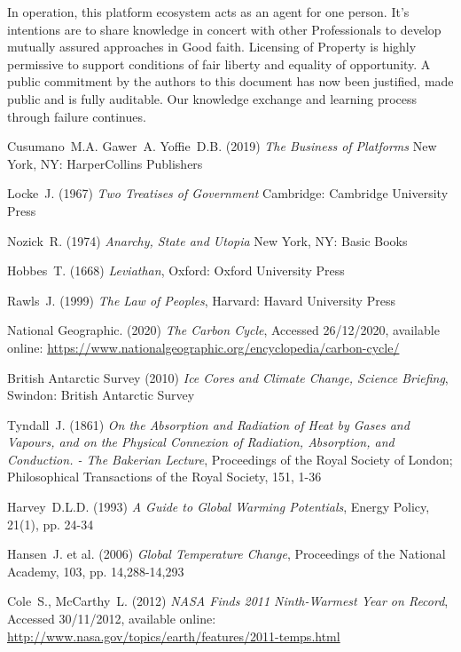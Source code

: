 \documentclass[11pt, oneside]{article}   	%
\begin{document}
In operation, this platform ecosystem acts as an agent for one person.
It's intentions are to share knowledge in concert with other Professionals to develop mutually assured approaches in Good faith.
Licensing of Property is highly permissive to support conditions of fair liberty and equality of opportunity.
A public commitment by the authors to this document has now been justified, made public and is fully auditable.
Our knowledge exchange and learning process through failure continues.\

\pagebreak

\begin{thebibliography}{99}

 Cusumano~M.A. Gawer~A. Yoffie~D.B. (2019)
\emph{The Business of Platforms}
New York, NY: HarperCollins Publishers

 Locke~J. (1967)
\emph{Two Treatises of Government}
Cambridge: Cambridge University Press

 Nozick~R. (1974)
\emph{Anarchy, State and Utopia}
New York, NY: Basic Books

 Hobbes~T. (1668)
\emph{Leviathan},
Oxford: Oxford University Press

 Rawls~J. (1999)
\emph{The Law of Peoples},
Harvard: Havard University Press

 National Geographic. (2020)
\emph{The Carbon Cycle},
Accessed 26/12/2020, available online: 
\url{https://www.nationalgeographic.org/encyclopedia/carbon-cycle/}
	
 British Antarctic Survey (2010)
\emph{Ice Cores and Climate Change, Science Briefing},
Swindon: British Antarctic Survey
	
 Tyndall~J. (1861)
\emph{On the Absorption and Radiation of Heat by Gases and Vapours, and on the Physical Connexion of Radiation, Absorption, and Conduction. - The Bakerian Lecture},
Proceedings of the Royal Society of London; Philosophical Transactions of the Royal Society, 151, 1-36
	
 Harvey~D.L.D. (1993)
\emph{A Guide to Global Warming Potentials},
Energy Policy, 21(1), pp. 24-34
	
 Hansen~J. et al. (2006)
\emph{Global Temperature Change},
Proceedings of the National Academy, 103, pp. 14,288-14,293
	
 Cole~S., McCarthy~L. (2012)
\emph{NASA Finds 2011 Ninth-Warmest Year on Record},
Accessed 30/11/2012, available online: 
\url{http://www.nasa.gov/topics/earth/features/2011-temps.html}
	

\end{thebibliography}
\end{document}
